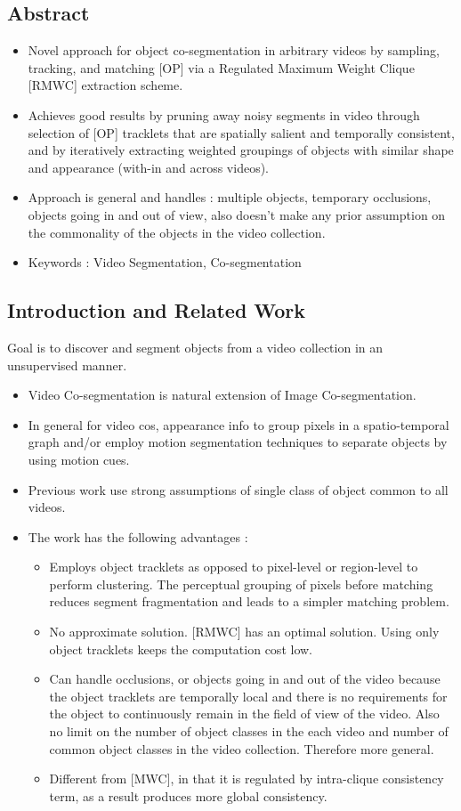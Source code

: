 \documentclass{article}
\begin{document}
\subsection{Abstract}
\begin{itemize}
\item Novel approach for object co-segmentation in arbitrary videos by sampling, tracking, and matching [OP] via a Regulated Maximum Weight Clique [RMWC] extraction scheme.
\item Achieves good results by pruning away noisy segments in video through selection of [OP] tracklets that are spatially salient and temporally consistent, and by iteratively extracting weighted groupings of objects with similar shape and appearance (with-in and across videos).
\item Approach is general and handles : multiple objects, temporary occlusions, objects going in and out of view, also doesn't make any prior assumption on the commonality of the objects in the video collection.
\item Keywords : Video Segmentation, Co-segmentation
\end{itemize}

\subsection{Introduction and Related Work}
Goal is to discover and segment objects from a video collection in an unsupervised manner.

\begin{itemize}
\item Video Co-segmentation is natural extension of Image Co-segmentation.
\item In general for video cos, appearance info to group pixels in a spatio-temporal graph and/or employ motion segmentation techniques to separate objects by using motion cues.
\item Previous work use strong assumptions of single class of object common to all videos.
\item The work has the following advantages :
  \begin{itemize}
  \item Employs object tracklets as opposed to pixel-level or region-level to perform clustering. The perceptual grouping of pixels before matching reduces segment fragmentation and leads to a simpler matching problem.
  \item No approximate solution. [RMWC] has an optimal solution. Using only object tracklets keeps the computation cost low.
  \item Can handle occlusions, or objects going in and out of the video because the object tracklets are temporally local and there is no requirements for the object to continuously remain in the field of view of the video. Also no limit on the number of object classes in the each video and number of common object classes in the video collection. Therefore more general.
  \item Different from [MWC], in that it is regulated by intra-clique consistency term, as a result produces more global consistency.
  \end{itemize}
\end{itemize}
\end{document}

